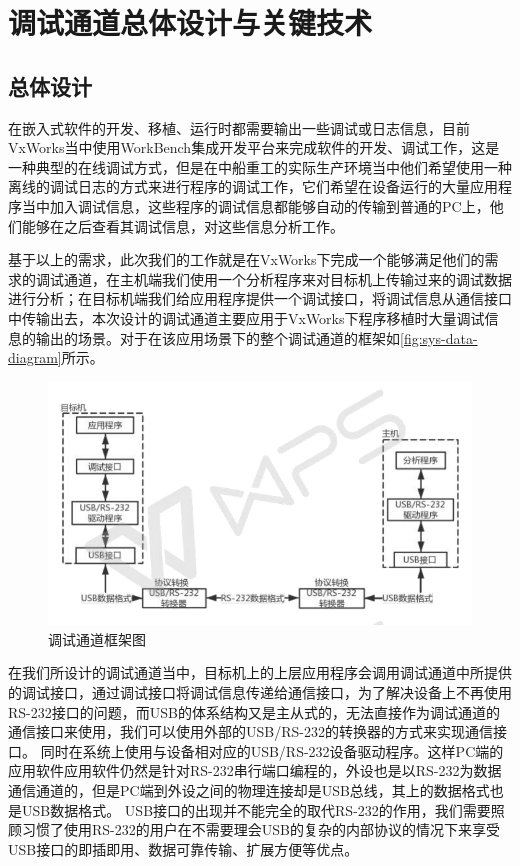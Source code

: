 \chapter{调试通道总体设计与关键技术}

\section{总体设计}
	在嵌入式软件的开发、移植、运行时都需要输出一些调试或日志信息，目前VxWorks当中使用WorkBench集成开发平台来完成软件的开发、调试工作，这是一种典型的在线调试方式，但是在中船重工的实际生产环境当中他们希望使用一种离线的调试日志的方式来进行程序的调试工作，它们希望在设备运行的大量应用程序当中加入调试信息，这些程序的调试信息都能够自动的传输到普通的PC上，他们能够在之后查看其调试信息，对这些信息分析工作。
	
	基于以上的需求，此次我们的工作就是在VxWorks下完成一个能够满足他们的需求的调试通道，在主机端我们使用一个分析程序来对目标机上传输过来的调试数据进行分析；在目标机端我们给应用程序提供一个调试接口，将调试信息从通信接口中传输出去，本次设计的调试通道主要应用于VxWorks下程序移植时大量调试信息的输出的场景。对于在该应用场景下的整个调试通道的框架如\autoref{fig:sys-data-diagram}所示。

\begin{figure}[!h]
\centering
\includegraphics[width=1.0\textwidth]{./graphics/sys-data-diagram.pdf}
\caption{调试通道框架图}\label{fig:sys-data-diagram}
\end{figure}

	在我们所设计的调试通道当中，目标机上的上层应用程序会调用调试通道中所提供的调试接口，通过调试接口将调试信息传递给通信接口，为了解决设备上不再使用RS-232接口的问题，而USB的体系结构又是主从式的，无法直接作为调试通道的通信接口来使用，我们可以使用外部的USB/RS-232的转换器的方式来实现通信接口。
	同时在系统上使用与设备相对应的USB/RS-232设备驱动程序。这样PC端的应用软件应用软件仍然是针对RS-232串行端口编程的，外设也是以RS-232为数据通信通道的，但是PC端到外设之间的物理连接却是USB总线，其上的数据格式也是USB数据格式。
	USB接口的出现并不能完全的取代RS-232的作用，我们需要照顾习惯了使用RS-232的用户在不需要理会USB的复杂的内部协议的情况下来享受USB接口的即插即用、数据可靠传输、扩展方便等优点。
	
